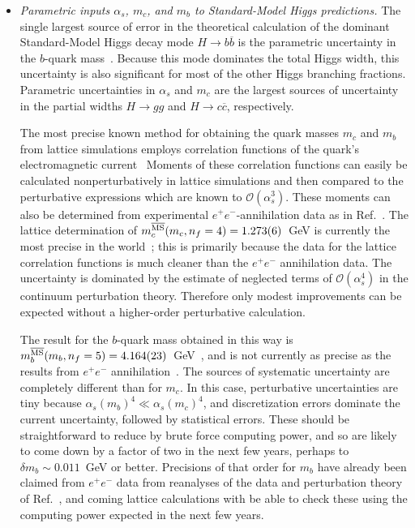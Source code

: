 \begin{itemize}

\item {\it Parametric inputs $\alpha_s$, $m_c$, and $m_b$ to Standard-Model Higgs predictions.}  The single largest source of error in the theoretical calculation of the dominant Standard-Model Higgs decay mode $H\rightarrow b\overline{b}$ is  the parametric uncertainty in the $b$-quark mass~\cite{Denner:2011mq}.  Because this mode dominates the total Higgs width, this uncertainty is also significant for most of the other Higgs branching fractions.  Parametric uncertainties in $\alpha_s$ and $m_c$ are the largest sources of uncertainty in the partial widths $H\rightarrow gg$ and $H\rightarrow c\overline{c}$, respectively.
 
The most precise known method for obtaining the quark masses $m_c$ and $m_b$ from lattice simulations employs correlation functions of the quark's electromagnetic current~\cite{Allison:2008xk,McNeile:2010ji}  Moments of these correlation functions can easily be calculated nonperturbatively in lattice simulations and then compared to the perturbative expressions which are known to ${\mathcal O}(\alpha_s^3)$.  These moments can also be determined from experimental $e^+e^-$-annihilation data as in Ref.~\cite{Chetyrkin:2009fv}.  The lattice determination of $m_c^{\overline{\rm MS}}(m_c,n_f=4)= 1.273(6)$~GeV is currently the most precise in the world~\cite{Beringer:1900zz}; this is primarily because the data for the lattice correlation functions is much cleaner than the $e^+e^-$ annihilation data.  The uncertainty is dominated by the estimate of neglected terms of ${\mathcal O}(\alpha_s^4)$ in the continuum perturbation theory.  Therefore only modest improvements can be expected without a higher-order perturbative calculation.  

The result for the $b$-quark mass obtained in this way is
$m_b^{\overline{\rm MS}}(m_b, n_f=5) = 4.164(23)$~GeV~\cite{McNeile:2010ji}, and is not currently as precise as the results from
 $e^+e^-$ annihilation~\cite{Chetyrkin:2009fv,Beringer:1900zz}.
The sources of systematic uncertainty  are completely different than for $m_c$.
In this case, perturbative uncertainties are tiny because $\alpha_s(m_b)^4  \ll \alpha_s(m_c)^4$, and discretization errors dominate the current uncertainty, followed by statistical errors.  These should be straightforward to reduce by brute force computing
 power, and so are likely to come down by a factor of two in the next few years, 
 perhaps to $\delta m_b \sim 0.011$~GeV or better.  Precisions of that order for $m_b$ have already been claimed from
 $e^+e^-$ data from
 reanalyses of the data and perturbation theory of Ref.~\cite{Chetyrkin:2009fv}, and coming lattice
 calculations with be able to check these using the computing power expected in the next few years.
 

\end{itemize}
